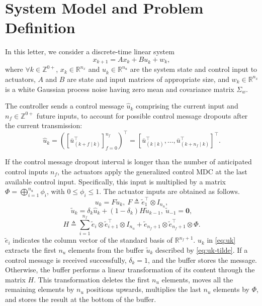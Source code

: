 \documentclass[journal,twoside,web]{ieeecolor}
\begin{document}
\section{System Model and Problem Definition}\label{sec:model}
In this letter, we consider a discrete-time linear system %
\begin{equation}\label{eq:state}
        x_{k+1} = A x_{k} + B u_{k}^{} + w_{k},
\end{equation}
where $\forall k \!\in\! \mathbb{Z}^{0+}$, $x_k\!\in\!\mathbb{R}^{n_x}$ and $u_k^{}\!\in\!\mathbb{R}^{n_u}$ are the system state and control input to actuators, $A$ and $B$ are state and input matrices of appropriate size, and $w_k\!\in\!\mathbb{R}^{n_x}$ is a white Gaussian process noise having zero mean and covariance matrix $\Sigma_w$.

The controller sends a control message $\hat{u}_k$ comprising the current input and $n_{f}\in\mathbb{Z}^{0+}$ future inputs, to account for possible control message dropouts after the current transmission: 
\begin{equation}\label{eq:control-message}
    \hat{u}_k =
    \left(\left[\bar{u}_{(k+f\mid k)}^{\top}\right]_{f=0}^{n_f}\right)^{\top} = 
    \left[\bar{u}_{(k\mid k)}^{\top},\dots,\bar{u}_{(k+n_f\mid k)}^{\top}\right]^{\top}.
\end{equation}

If the control message dropout interval is longer than the number of anticipated control inputs $n_f$, the actuators apply the generalized control MDC at the last available control input.  Specifically, this input is multiplied by a matrix $\mathit{\Phi}=\bigoplus_{i=1}^{n_u} \phi_i$, with $0 \leq \phi_i \leq 1$. 
The actuator inputs are obtained as follows.
\begin{equation}\label{eq:uk}
    u_k = F \tilde{u}_k,~F \triangleq \tilde{e}_{1}^{\top} \otimes I_{n_u},
\end{equation}
\begin{equation}\label{eq:uk-tilde}
    \tilde{u}_k = \delta_k \hat{u}_k + \left(1-\delta_k\right) H \tilde{u}_{k-1},~\tilde{u}_{-1} = \mathbf{0},
\end{equation}
\begin{equation}\label{eq:H}
    H \triangleq \sum_{i=1}^{n_f} \tilde{e}_{i} \otimes \tilde{e}_{i+1}^{\top} \otimes I_{n_u} + 
    \tilde{e}_{n_f+1} \otimes \tilde{e}_{n_f+1}^{\top} \otimes \mathit{\Phi}.
\end{equation}
$\tilde{e}_{i}$ indicates the column vector of the standard basis of $\mathbb{R}^{n_f+1}$.
$u_k$ in \eqref{eq:uk} extracts the first $n_u$ elements from the buffer $\tilde{u}_k$ described by \eqref{eq:uk-tilde}.
If a control message is received successfully, $\delta_k = 1$, and the buffer stores the message. Otherwise, the buffer performs a linear transformation of its content through the matrix $H$. This transformation deletes the first $n_u$ elements,  moves all the remaining elements by $n_u$ positions upwards, multiplies the last $n_u$ elements by $\mathit{\Phi}$, and stores the result at the bottom of the buffer.
\end{document}
